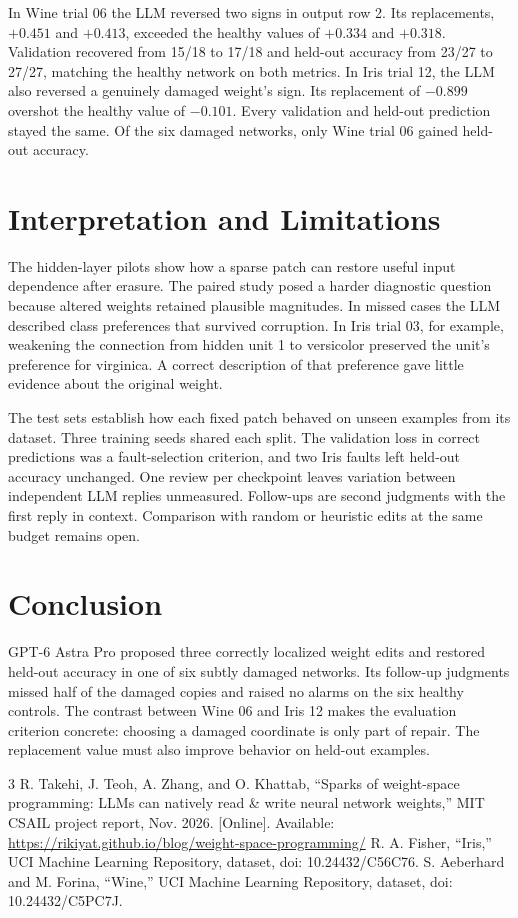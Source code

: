 \documentclass[conference,letterpaper]{IEEEtran}
\begin{document}
In Wine trial 06 the LLM reversed two signs in output row 2. Its replacements, $+0.451$ and $+0.413$, exceeded the healthy values of $+0.334$ and $+0.318$. Validation recovered from 15/18 to 17/18 and held-out accuracy from 23/27 to 27/27, matching the healthy network on both metrics. In Iris trial 12, the LLM also reversed a genuinely damaged weight's sign. Its replacement of $-0.899$ overshot the healthy value of $-0.101$. Every validation and held-out prediction stayed the same. Of the six damaged networks, only Wine trial 06 gained held-out accuracy.

\section{Interpretation and Limitations}
The hidden-layer pilots show how a sparse patch can restore useful input dependence after erasure. The paired study posed a harder diagnostic question because altered weights retained plausible magnitudes. In missed cases the LLM described class preferences that survived corruption. In Iris trial 03, for example, weakening the connection from hidden unit 1 to versicolor preserved the unit's preference for virginica. A correct description of that preference gave little evidence about the original weight.

The test sets establish how each fixed patch behaved on unseen examples from its dataset. Three training seeds shared each split. The validation loss in correct predictions was a fault-selection criterion, and two Iris faults left held-out accuracy unchanged. One review per checkpoint leaves variation between independent LLM replies unmeasured. Follow-ups are second judgments with the first reply in context. Comparison with random or heuristic edits at the same budget remains open.

\section{Conclusion}
GPT-6 Astra Pro proposed three correctly localized weight edits and restored held-out accuracy in one of six subtly damaged networks. Its follow-up judgments missed half of the damaged copies and raised no alarms on the six healthy controls. The contrast between Wine 06 and Iris 12 makes the evaluation criterion concrete: choosing a damaged coordinate is only part of repair. The replacement value must also improve behavior on held-out examples.

\begin{thebibliography}{3}
 R. Takehi, J. Teoh, A. Zhang, and O. Khattab, “Sparks of weight-space programming: LLMs can natively read \& write neural network weights,” MIT CSAIL project report, Nov. 2026. [Online]. Available: \url{https://rikiyat.github.io/blog/weight-space-programming/}
 R. A. Fisher, “Iris,” UCI Machine Learning Repository, dataset, doi: 10.24432/C56C76.
 S. Aeberhard and M. Forina, “Wine,” UCI Machine Learning Repository, dataset, doi: 10.24432/C5PC7J.
\end{thebibliography}
\end{document}
